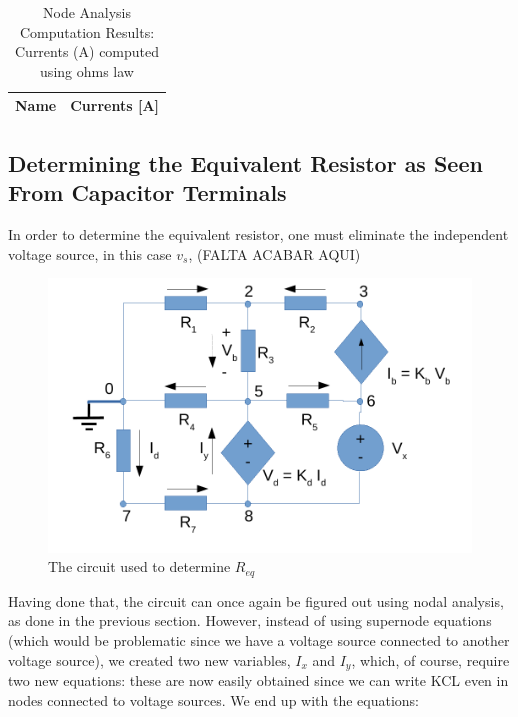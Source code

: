 \begin{table}[h]
  \centering
  \begin{tabular}{|l|r|}
    \hline    
    {\bf Name} & {\bf Currents [A]} \\ \hline
    
  \end{tabular}
  \caption{Node Analysis Computation Results: Currents (A) computed using ohms law}
  \label{tab:nodeCurrents1}
\end{table}






\subsection{Determining the Equivalent Resistor as Seen From Capacitor Terminals}

In order to determine the equivalent resistor, one must eliminate the independent voltage source, in this case $v_s$, (FALTA ACABAR AQUI)

\begin{figure}[h] \centering
\includegraphics[width=0.4\linewidth]{t2-t2.pdf}
\caption{The circuit used to determine $R_{eq}$}
\label{fig3}
\end{figure}

Having done that, the circuit can once again be figured out using nodal analysis, as done in the previous section. However, instead of using supernode equations
(which would be problematic since we have a voltage source connected to another voltage source), we created two new variables, $I_x$ and $I_y$, which, of course,
require two new equations: these are now easily obtained since we can write KCL even in nodes connected to voltage sources. We end up with the equations:

